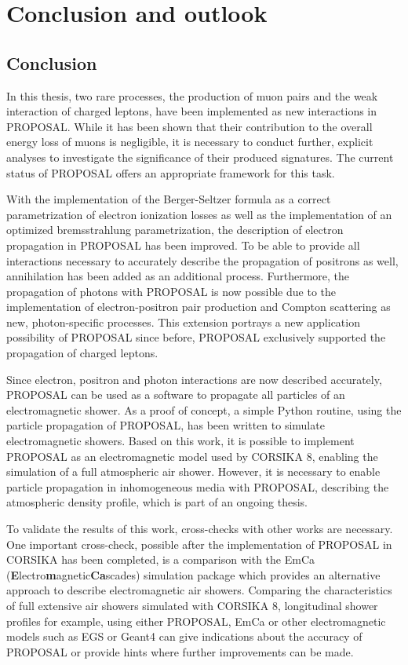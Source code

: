 \chapter{Conclusion and outlook} 

\section{Conclusion}

In this thesis, two rare processes, the production of muon pairs and the weak interaction of charged leptons, have been implemented as new interactions in PROPOSAL.
While it has been shown that their contribution to the overall energy loss of muons is negligible, it is necessary to conduct further, explicit analyses to investigate the significance of their produced signatures.
The current status of PROPOSAL offers an appropriate framework for this task.

With the implementation of the Berger-Seltzer formula as a correct parametrization of electron ionization losses as well as the implementation of an optimized bremsstrahlung parametrization, the description of electron propagation in PROPOSAL has been improved.
To be able to provide all interactions necessary to accurately describe the propagation of positrons as well, annihilation has been added as an additional process.
Furthermore, the propagation of photons with PROPOSAL is now possible due to the implementation of electron-positron pair production and Compton scattering as new, photon-specific processes.
This extension portrays a new application possibility of PROPOSAL since before, PROPOSAL exclusively supported the propagation of charged leptons.

Since electron, positron and photon interactions are now described accurately, PROPOSAL can be used as a software to propagate all particles of an electromagnetic shower.
As a proof of concept, a simple Python routine, using the particle propagation of PROPOSAL, has been written to simulate electromagnetic showers.
Based on this work, it is possible to implement PROPOSAL as an electromagnetic model used by CORSIKA 8, enabling the simulation of a full atmospheric air shower.
However, it is necessary to enable particle propagation in inhomogeneous media with PROPOSAL, describing the atmospheric density profile, which is part of an ongoing thesis.

To validate the results of this work, cross-checks with other works are necessary.
One important cross-check, possible after the implementation of PROPOSAL in CORSIKA has been completed, is a comparison with the EmCa (\textbf{E}lectro\textbf{m}agnetic\-\textbf{Ca}scades) simulation package \cite{meighenberger2019emca} which provides an alternative approach to describe electromagnetic air showers.
Comparing the characteristics of full extensive air showers simulated with CORSIKA 8, longitudinal shower profiles for example, using either PROPOSAL, EmCa or other electromagnetic models such as EGS or Geant4 can give indications about the accuracy of PROPOSAL or provide hints where further improvements can be made.

